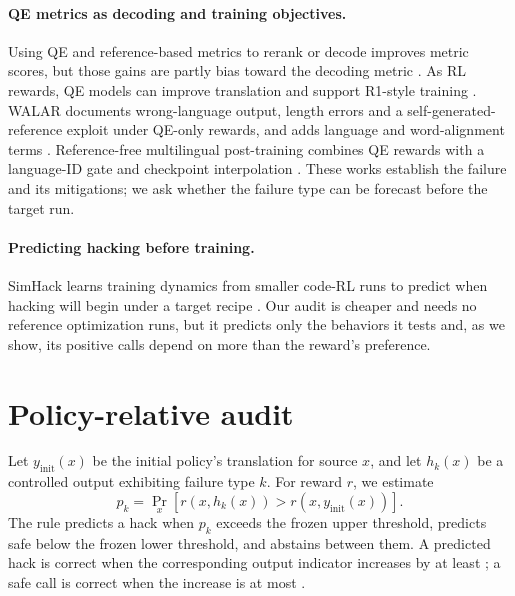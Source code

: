 \documentclass[11pt]{article}
\begin{document}
\paragraph{QE metrics as decoding and training objectives.}
Using QE and reference-based metrics to rerank or decode improves metric scores,
but those gains are partly bias toward the decoding metric
\citep{fernandes-etal-2022-quality,kovacs-etal-2024-mitigating}.  As RL rewards,
QE models can improve translation \citep{he-etal-2024-improving} and support
R1-style training \citep{feng-etal-2025-mtr1zero}.  WALAR documents
wrong-language output, length errors and a self-generated-reference exploit
under QE-only rewards, and adds language and word-alignment terms
\citep{liu-etal-2026-mending}.  Reference-free multilingual post-training
combines QE rewards with a language-ID gate and checkpoint interpolation
\citep{han-etal-2026-reference-free}.  These works establish the failure and
its mitigations; we ask whether the failure type can be forecast before the
target run.

\paragraph{Predicting hacking before training.}
SimHack learns training dynamics from smaller code-RL runs to predict when
hacking will begin under a target recipe \citep{deng-etal-2026-simhack}.  Our
audit is cheaper and needs no reference optimization runs, but it predicts only
the behaviors it tests and, as we show, its positive calls depend on more than
the reward's preference.

\section{Policy-relative audit}

Let $y_{\mathrm{init}}(x)$ be the initial policy's translation for source $x$, and let
$h_k(x)$ be a controlled output exhibiting failure type $k$.  For reward $r$,
we estimate
\begin{equation}
  p_k = \Pr_x[r(x,h_k(x)) > r(x,y_{\mathrm{init}}(x))].
\end{equation}
The rule predicts a hack when $p_k$ exceeds the frozen upper threshold, predicts
safe below the frozen lower threshold, and abstains between them.  A predicted
hack is correct when the corresponding output indicator increases by at least
\HackThreshold{}; a safe call is correct when the increase is at most
\SafeThreshold{}.
\end{document}
